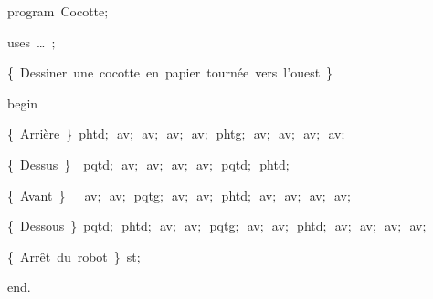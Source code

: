 
{
\parindent {}
\medskip

\carrenoir
\vspace{\neglskip}\mbox{\blc  \idt  \mcl program\idt \ Cocotte$;$
}\par 
\vspace{\neglskip}\mbox{\blc \blk\idt \mcl uses\idt \ \ldots\ $;$
}\par 
\vspace{\neglskip}\mbox{\blc  \blk\idt  \cmt  \{\ Dessiner\ une\ cocotte\ en\ papier\ tournée\ vers\ l{'}ouest\ \}\idt }\par 
\vspace{\neglskip}\mbox{\blc  \idt  \mcl begin\idt }\par 
\vspace{\neglskip}\mbox{\blc  \blk\idt  \cmt  \{\ Arrière\ \}\idt \ phtd$;$\ av$;$\ av$;$\ av$;$\ av$;$\ phtg$;$\ av$;$\ av$;$\ av$;$\ av$;$\ }\par 
\vspace{\neglskip}\mbox{\blc  \blk\idt  \cmt  \{\ Dessus\ \}\idt \ \ pqtd$;$\ av$;$\ av$;$\ av$;$\ av$;$\ pqtd$;$\ phtd$;$\ }\par 
\vspace{\neglskip}\mbox{\blc  \blk\idt  \cmt  \{\ Avant\ \}\idt \ \ \ av$;$\ av$;$\ pqtg$;$\ av$;$\ av$;$\ phtd$;$\ av$;$\ av$;$\ av$;$\ av$;$\ }\par 
\vspace{\neglskip}\mbox{\blc  \blk\idt  \cmt  \{\ Dessous\ \}\idt \ pqtd$;$\ phtd$;$\ av$;$\ av$;$\ pqtg$;$\ av$;$\ av$;$\ phtd$;$\ av$;$\ av$;$\ av$;$\ av$;$\ }\par 
\vspace{\neglskip}\mbox{\blc  \blk\idt  \cmt  \{\ Arrêt\ du\ robot\ \}\idt \ st$;$}\par 
\vspace{\neglskip}\mbox{\blc  \idt  \mcl end\idt $.$}\par 

\medskip }


